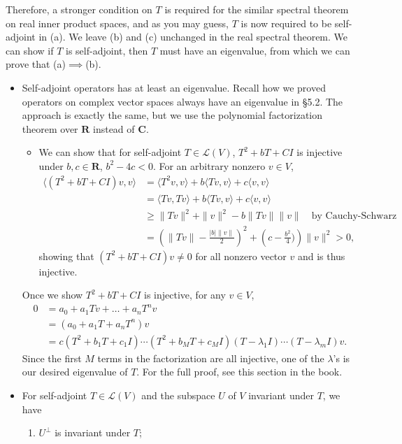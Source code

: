 \documentclass{article}
\newcommand{\R}{\mathbf{R}}
\newcommand{\C}{\mathbf{C}}
\newcommand{\inp}[2]{\langle #1, #2 \rangle}
\newcommand{\nm}[1]{\| #1 \|}
\newcommand{\LV}{\mathcal{L}(V)}
\begin{document}
Therefore, a stronger condition on $T$ is required for the similar spectral theorem on real inner product spaces, and as you may guess, $T$ is now required to be self-adjoint in (a). We leave (b) and (c) unchanged in the real spectral theorem. We can show if $T$ is self-adjoint, then $T$ must have an eigenvalue, from which we can prove that (a)$\implies$(b).
    \begin{itemize}
    \item Self-adjoint operators has at least an eigenvalue. Recall how we proved operators on complex vector spaces always have an eigenvalue in \S 5.2. The approach is exactly the same, but we use the polynomial factorization theorem over $\R$ instead of $\C$.
    \begin{itemize}
        \item We can show that for self-adjoint $T \in \LV$, $T^2+bT+CI$ is injective under $b,c\in\R$, $b^2-4c<0$. For an arbitrary nonzero $v \in V$,
        \begin{align*}
            \inp{(T^2+bT+CI)v}{v} & = \inp{T^2v}{v}+b\inp{Tv}{v}+c\inp{v}{v} \\
            & = \inp{Tv}{Tv}+b\inp{Tv}{v}+c\inp{v}{v} \\
            & \geq \nm{Tv}^2+\nm{v}^2 -b\nm{Tv}\nm{v} \quad \text{by Cauchy-Schwarz}\\
            & = \left(\nm{Tv}-\frac{|b|\nm{v}}{2}\right)^2 + \left(c - \frac{b^2}{4})\right)\nm{v}^2 > 0,
        \end{align*}
        showing that $(T^2+bT+CI)v \not= 0$ for all nonzero vector $v$ and is thus injective.
    \end{itemize}
    Once we show $T^2+bT+CI$ is injective, for any $v \in V$,
    \begin{align*}
        0 & = a_0+a_1Tv+\dots+a_nT^nv \\
        & = (a_0+a_1T+a_nT^n) v \\
        & = c(T^2+b_1T+c_1I)\cdots(T^2+b_MT+c_MI)(T-\lambda_1I)\cdots(T-\lambda_mI)v.
    \end{align*}
    Since the first $M$ terms in the factorization are all injective, one of the $\lambda$'s is our desired eigenvalue of $T$. For the full proof, see this section in the book.
    \item For self-adjoint $T \in \LV$ and the subspace $U$ of $V$ invariant under $T$, we have
    \begin{enumerate}[label=(\alph*)]
        \item $U^\perp$ is invariant under $T$;
        

\end{enumerate}
\end{itemize}
\end{document}
